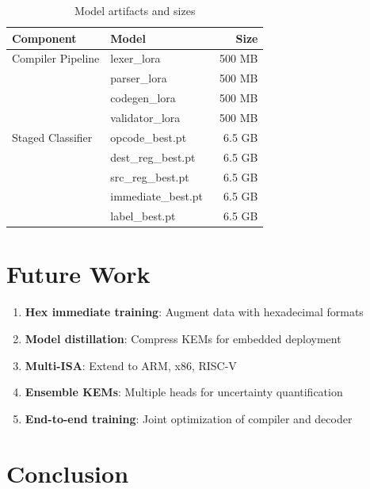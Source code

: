 \documentclass[11pt]{article}
\begin{document}
\begin{table}[h]
\centering
\begin{tabular}{llr}
\toprule
\textbf{Component} & \textbf{Model} & \textbf{Size} \\
\midrule
Compiler Pipeline & lexer\_lora & ~500 MB \\
& parser\_lora & ~500 MB \\
& codegen\_lora & ~500 MB \\
& validator\_lora & ~500 MB \\
\midrule
Staged Classifier & opcode\_best.pt & 6.5 GB \\
& dest\_reg\_best.pt & 6.5 GB \\
& src\_reg\_best.pt & 6.5 GB \\
& immediate\_best.pt & 6.5 GB \\
& label\_best.pt & 6.5 GB \\
\bottomrule
\end{tabular}
\caption{Model artifacts and sizes}
\end{table}

\section{Future Work}

\begin{enumerate}
    \item \textbf{Hex immediate training}: Augment data with hexadecimal formats
    \item \textbf{Model distillation}: Compress KEMs for embedded deployment
    \item \textbf{Multi-ISA}: Extend to ARM, x86, RISC-V
    \item \textbf{Ensemble KEMs}: Multiple heads for uncertainty quantification
    \item \textbf{End-to-end training}: Joint optimization of compiler and decoder
\end{enumerate}

\section{Conclusion}
\end{document}
